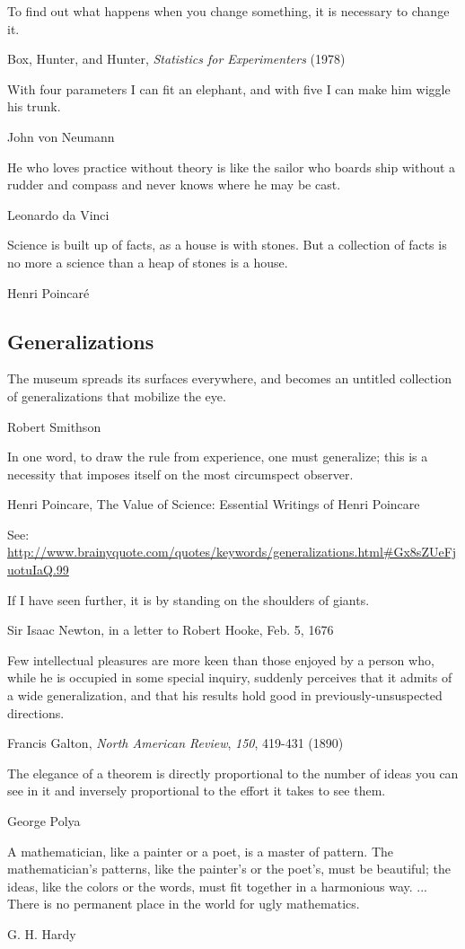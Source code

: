 \epigraph{To find out what happens when you change something, it is necessary to change it.}{Box, Hunter, and Hunter, \emph{Statistics for Experimenters} (1978)}

\epigraph{With four parameters I can fit an elephant, and with five I can make him wiggle his trunk. }{John von Neumann}

\epigraph{He who loves practice without theory is like the sailor who boards ship without a rudder and compass and never knows where he may be cast.}{Leonardo da Vinci}

\epigraph{Science is built up of facts, as a house is with stones. But a collection of facts is no more a science than a heap of stones is a house.}{Henri Poincar\'e}
\subsection{Generalizations}
\epigraph{The museum spreads its surfaces everywhere, and becomes an untitled collection of generalizations that mobilize the eye.}{Robert Smithson}

\epigraph{In one word, to draw the rule from experience, one must generalize; this is a necessity that imposes itself on the most circumspect observer.}{Henri Poincare, The Value of Science: Essential Writings of Henri Poincare}


See: \url{http://www.brainyquote.com/quotes/keywords/generalizations.html#Gx8sZUeFjuotuIaQ.99}

\epigraph{If I have seen further, it is by standing on the shoulders of giants.}{Sir Isaac Newton, in a letter to Robert Hooke, Feb. 5, 1676}

\epigraph{Few intellectual pleasures are more keen than those enjoyed by a person who, while he is occupied in some special inquiry, suddenly perceives that it admits of a wide generalization, and that his results hold good in previously-unsuspected directions.}{Francis Galton, \emph{North American Review}, \emph{150}, 419-431 (1890)}

\epigraph{The elegance of a theorem is directly proportional to the number of ideas you can see in it and inversely proportional to the effort it takes to see them.}{George Polya}

\epigraph{A mathematician, like a painter or a poet, is a master of pattern. The mathematician's patterns, like the painter's or the poet's, must be beautiful; the ideas, like the colors or the words, must fit together in a harmonious way. ... There is no permanent place in the world for ugly mathematics.}{G. H. Hardy}

